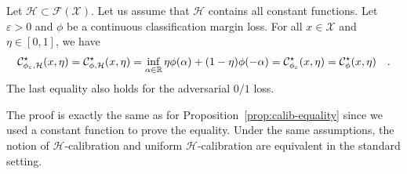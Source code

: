 \begin{prop*}
\label{prop:hcalequality}
Let $\mathcal{H}\subset \mathcal{F}(\mathcal{X})$. Let us assume that $\mathcal{H}$ contains all constant functions. Let $\varepsilon>0$ and $\phi$ be a continuous classification margin loss.  For all $x\in\mathcal{X}$ and $\eta\in[0,1]$, we have
\begin{align*}
    \mathcal{C}^\star_{\phi_\varepsilon,\mathcal{H}}(x,\eta)=\mathcal{C}^\star_{\phi,\mathcal{H}}(x,\eta) =\inf_{\alpha\in\mathbb{R}}\eta \phi(\alpha)+(1-\eta)\phi(-\alpha)= \mathcal{C}^\star_{\phi_\varepsilon}(x,\eta)=\mathcal{C}^\star_{\phi}(x,\eta)\quad.
\end{align*}
The last equality also holds for the adversarial $0/1$ loss.
\end{prop*}
The proof is exactly the same as for Proposition~\ref{prop:calib-equality} since we used a constant function to prove the equality. Under the same assumptions, the notion of $\mathcal{H}$-calibration and uniform $\mathcal{H}$-calibration are equivalent in the standard setting.




